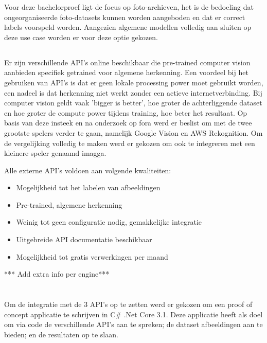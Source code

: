 Voor deze bachelorproef ligt de focus op foto-archieven, het is de bedoeling dat ongeorganiseerde foto-datasets kunnen worden aangeboden en dat er correct labels voorspeld worden. Aangezien algemene modellen volledig aan sluiten op deze use case worden er voor deze optie gekozen.

\subsection{}
\label{sec:keuze-externe-API}
Er zijn verschillende API's online beschikbaar die pre-trained computer vision aanbieden specifiek getrained voor algemene herkenning. Een voordeel bij het gebruiken van API's is dat er geen lokale processing power moet gebruikt worden, een nadeel is dat herkenning niet werkt zonder een actieve internetverbinding. Bij computer vision geldt vaak 'bigger is better', hoe groter de achterliggende dataset en hoe groter de compute power tijdens training, hoe beter het resultaat. Op basis van deze insteek en na onderzoek op fora werd er beslist om met de twee grootste spelers verder te gaan, namelijk Google Vision en AWS Rekognition. Om de vergelijking volledig te maken werd er gekozen om ook te integreren met een kleinere speler genaamd imagga.

Alle externe API's voldoen aan volgende kwaliteiten:
 \begin{itemize}
     \item Mogelijkheid tot het labelen van afbeeldingen
     \item Pre-trained, algemene herkenning
     \item Weinig tot geen configuratie nodig, gemakkelijke integratie
     \item Uitgebreide API documentatie beschikbaar
     \item Mogelijkheid tot gratis verwerkingen per maand
 \end{itemize}

*** Add extra info per engine***

\section{}
\label{sec:integratie-met-computer-vision}
Om de integratie met de 3 API's op te zetten werd er gekozen om een proof of concept applicatie te schrijven in C\# .Net Core 3.1. Deze applicatie heeft als doel om via code de verschillende API's aan te spreken; de dataset afbeeldingen aan te bieden; en de resultaten op te slaan. 

